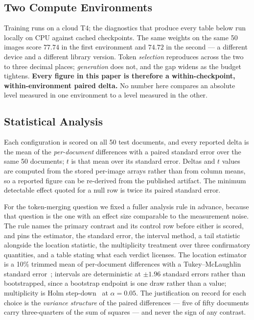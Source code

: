 \documentclass[conference]{IEEEtran}
\begin{document}
\subsection{Two Compute Environments}
\label{sec:environments}

Training runs on a cloud T4; the diagnostics that produce every table below run locally on
CPU against cached checkpoints. The same weights on the same 50 images score $77.74$ in the
first environment and $74.72$ in the second --- a different device and a different library
version. Token \emph{selection} reproduces across the two to three decimal places;
\emph{generation} does not, and the gap widens as the budget tightens. \textbf{Every figure
in this paper is therefore a within-checkpoint, within-environment paired delta.} No number
here compares an absolute level measured in one environment to a level measured in the other.

\subsection{Statistical Analysis}
\label{sec:stats}

Each configuration is scored on all 50 test documents, and every reported delta is the mean
of the \emph{per-document} differences with a paired standard error over the same 50
documents; $t$ is that mean over its standard error. Deltas and $t$ values are computed from
the stored per-image arrays rather than from column means, so a reported figure can be
re-derived from the published artifact. The minimum detectable effect quoted for a null row
is twice its paired standard error.

For the token-merging question we fixed a fuller analysis rule in advance, because that
question is the one with an effect size comparable to the measurement noise. The rule names
the primary contrast and its control row before either is scored, and pins the estimator, the
standard error, the interval method, a tail statistic alongside the location statistic, the
multiplicity treatment over three confirmatory quantities, and a table stating what each
verdict licenses. The location estimator is a 10\% trimmed mean of per-document differences
with a Tukey--McLaughlin standard error~\cite{tukey}; intervals are deterministic at
$\pm 1.96$ standard errors rather than bootstrapped, since a bootstrap endpoint is one draw
rather than a value; multiplicity is Holm step-down~\cite{holm} at $\alpha = 0.05$. The
justification on record for each choice is the \emph{variance structure} of the paired
differences --- five of fifty documents carry three-quarters of the sum of squares --- and
never the sign of any contrast.
\end{document}
